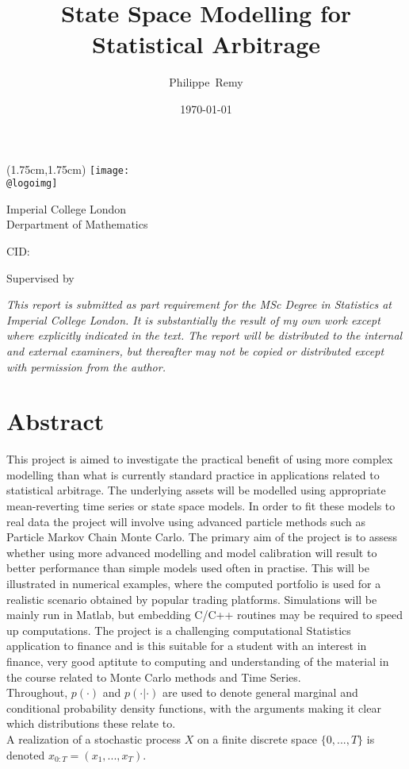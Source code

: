 \documentclass[11pt,a4,twosided,singlespacing,titlepagenumber=on]{scrreprt}
\title{State Space Modelling for Statistical Arbitrage}
\author{Philippe~Remy}
\date{\today}
\makeatletter
\numberwithin{equation}{chapter} %
\theoremstyle{remark}
\renewcommand{\maketitle}{
\begin{titlepage}
\ifdefined\@logoimg
\begin{textblock*}{8cm}(1.75cm,1.75cm)
\texttt{[image: \\@logoimg]}
\end{textblock*}
\vspace*{1cm}
\else
\fi
\begin{center}
\vspace*{\stretch{0.1}}
Imperial College London\\
Derpartment of Mathematics\par
\vspace*{\stretch{1}} %
{\titlefont\Huge \@title\par} %
\vspace*{\stretch{2}}
{\Large \@author \par}
\vspace*{1em}
{\large CID: \@CID \par}
\vspace*{\stretch{0.5}}
{\large Supervised by \@supervisor \par}
\vspace*{\stretch{3}}
{\Large \@date \par}
\vspace*{\stretch{1}}

\textit{This report is submitted as part requirement for the MSc Degree in Statistics at Imperial College London. It is substantially the result of my own work except where explicitly indicated in the text.
The report will be distributed to the internal and external examiners, but thereafter may not be
copied or distributed except with permission from the author.}
\vspace*{\stretch{0.1}}
\end{center}%
\end{titlepage}%
}
\renewenvironment{abstract}%
{\chapter*{Abstract}\thispagestyle{plain}}%
{\clearpage}
\newenvironment{myquote}%
{\begin{quote}{\Large{}``}}%
{\ifhmode\unskip\fi{\Large{}''}\end{quote}}
\makeatother
\begin{document}
\maketitle

\declaration

\begin{abstract}
This project is aimed to investigate the practical benefit of using more complex modelling than what is currently standard practice in applications related to statistical arbitrage. The underlying assets will be modelled using appropriate mean-reverting time series or state space models. In order to fit these models to real data the project will involve using advanced particle methods such as Particle Markov Chain Monte Carlo. The primary aim of the project is to assess whether using more advanced modelling and model calibration will result to better performance than simple models used often in practise. This will be illustrated in numerical examples, where the computed portfolio is used for a realistic scenario obtained by popular trading platforms. Simulations will be mainly run in Matlab, but embedding C/C++ routines may be required to speed up computations. The project is a challenging computational Statistics application to finance and is this suitable for a student with an interest in finance, very good aptitute to computing and understanding of the material in the course related to Monte Carlo methods and Time Series. \\

Throughout, $p(\cdot)$ and $p(\cdot| \cdot)$ are used to denote general marginal and conditional probability density functions, with the arguments making it clear which distributions these relate to. \\
A realization of a stochastic process $X$ on a finite discrete space $\{0,...,T\}$ is denoted $x_{0:T} = (x_1,...,x_T)$.
\end{abstract}
\newpage


\end{document}
